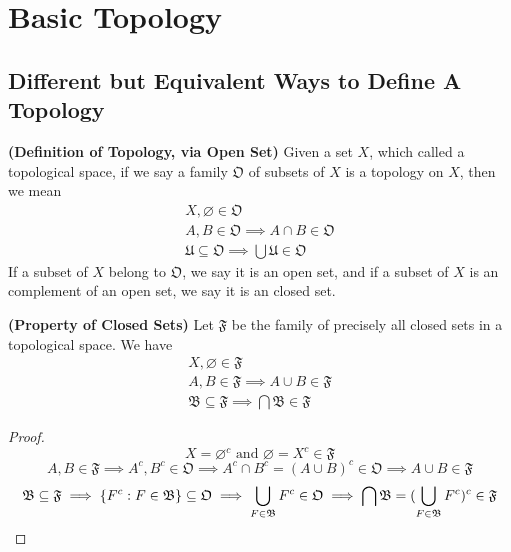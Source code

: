 \documentclass{report}
\begin{document}
\chapter{Basic Topology} 
\section{Different but Equivalent Ways to Define A Topology}
\begin{definition}
\label{2.1.1}
\textbf{(Definition of Topology, via Open Set)} Given a set $X$, which called a topological space, if we say a family $\mathfrak{O}$  of subsets of $X$ is a topology on $X$, then we mean
\begin{gather}
X, \varnothing \in \mathfrak{O}\\
A,B\in\mathfrak{O}\implies A\cap B\in\mathfrak{O}\\
\mathfrak{U}\subseteq \mathfrak{O}\implies \bigcup \mathfrak{U}\in \mathfrak{O}
\end{gather}
If a subset of $X$ belong to  $\mathfrak{O}$, we say it is an open set, and if a subset of $X$ is an complement of an open set, we say it is an closed set.
\end{definition}
\begin{theorem}
\label{2.1.2}
\textbf{(Property of Closed Sets)} Let $\mathfrak{F}$ be the family of precisely all closed sets in a topological space. We have
\begin{gather}
X,\varnothing \in \mathfrak{F}\\
A,B\in\mathfrak{F}\implies A\cup  B\in\mathfrak{F}\\
\mathfrak{B}\subseteq \mathfrak{F}\implies \bigcap \mathfrak{B}\in \mathfrak{F}
\end{gather}
\end{theorem}
\begin{proof}
\begin{equation}
X=\varnothing^c\text{ and }\varnothing=X^c\in \mathfrak{F}
\end{equation}
\begin{equation}
A,B\in \mathfrak{F}\implies A^c,B^c \in \mathfrak{O}\implies A^c \cap B^c=(A\cup B)^c \in \mathfrak{O} \implies A\cup  B \in \mathfrak{F}
\end{equation}
\begin{equation}
\mathfrak{B}\subseteq \mathfrak{F}\implies \{ F^c:F \in \mathfrak{B} \}\subseteq \mathfrak{O}\implies \bigcup_{F\in \mathfrak{B}}F^c \in \mathfrak{O}\implies \bigcap \mathfrak{B}= (\bigcup_{F \in\mathfrak{B}} F^c)^c \in \mathfrak{F}
\end{equation}
\end{proof}
\end{document}
